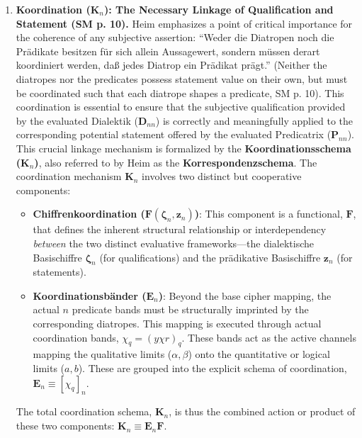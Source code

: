 \documentclass[12pt]{article}
\newcommand{\q}[1]{\enquote{#1}}
\begin{document}
\begin{enumerate}
    \item \textbf{Koordination (\( \mathbf{K}_n \)): The Necessary Linkage of Qualification and Statement (SM p. 10).}
    Heim emphasizes a point of critical importance for the coherence of any subjective assertion: \q{Weder die Diatropen noch die Prädikate besitzen für sich allein Aussagewert, sondern müssen derart koordiniert werden, daß jedes Diatrop ein Prädikat prägt.} (Neither the diatropes nor the predicates possess statement value on their own, but must be coordinated such that each diatrope shapes a predicate, SM p. 10). This coordination is essential to ensure that the subjective qualification provided by the evaluated Dialektik (\( \mathbf{D}_{nn} \)) is correctly and meaningfully applied to the corresponding potential statement offered by the evaluated Predicatrix (\( \mathbf{P}_{nn} \)). This crucial linkage mechanism is formalized by the \textbf{Koordinationsschema (\( \mathbf{K}_n \))}, also referred to by Heim as the \textbf{Korrespondenzschema}. The coordination mechanism \( \mathbf{K}_n \) involves two distinct but cooperative components:
    \begin{itemize}
        \item \textbf{Chiffrenkoordination (\( \mathbf{F}(\bm{\zeta}_n, \mathbf{z}_n) \))}: This component is a functional, \(\mathbf{F}\), that defines the inherent structural relationship or interdependency \textit{between} the two distinct evaluative frameworks—the dialektische Basischiffre \( \bm{\zeta}_n \) (for qualifications) and the prädikative Basischiffre \( \mathbf{z}_n \) (for statements). 
        \item \textbf{Koordinationsbänder (\( \mathbf{E}_n \))}: Beyond the base cipher mapping, the actual \( n \) predicate bands must be structurally imprinted by the corresponding diatropes. This mapping is executed through actual coordination bands, \( \chi_q = (y \chi r)_q \). These bands act as the active channels mapping the qualitative limits (\( \alpha, \beta \)) onto the quantitative or logical limits (\( a, b \)). These are grouped into the explicit schema of coordination, \( \mathbf{E}_n \equiv [ \chi_q ]_n \).
    \end{itemize}
        The total coordination schema, \( \mathbf{K}_n \), is thus the combined action or product of these two components: \( \mathbf{K}_n \equiv \mathbf{E}_n \mathbf{F} \).


\end{enumerate}
\end{document}
